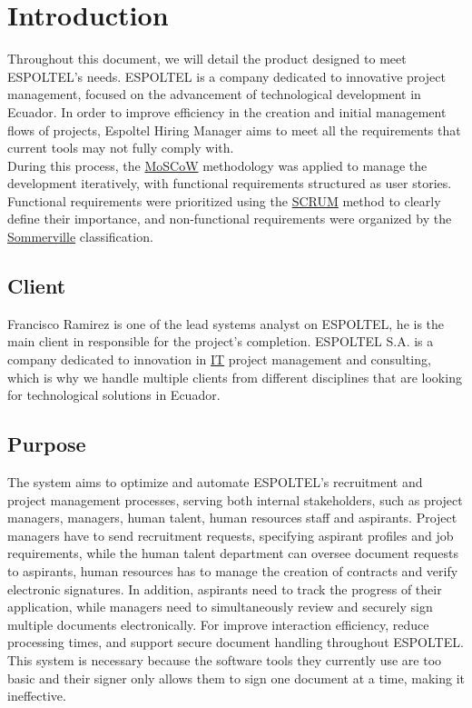 \documentclass{scrreprt}
\begin{document}
\chapter{Introduction}
Throughout this document, we will detail the product designed to meet ESPOLTEL's needs. ESPOLTEL is a company dedicated to innovative project management, focused on the advancement of technological development in Ecuador. In order to improve efficiency in the creation and initial management flows of projects, Espoltel Hiring Manager aims to meet all the requirements that current tools may not fully comply with.\\
During this process, the \hyperlink{moscow}{MoSCoW} methodology was applied to manage the development iteratively, with functional requirements structured as user stories. Functional requirements were prioritized using the \hyperlink{scrum}{SCRUM} method to clearly define their importance, and non-functional requirements were organized by the \hyperlink{sommerville}{Sommerville} classification.

\section{Client}
Francisco Ramirez is one of the lead systems analyst on ESPOLTEL, he is the main client in responsible for the project's completion. ESPOLTEL S.A. is a company dedicated to innovation in \hyperlink{it}{IT} project management and consulting, which is why we handle multiple clients from different disciplines that are looking for technological solutions in Ecuador.

 
\section{Purpose}
The system aims to optimize and automate ESPOLTEL's recruitment and project management processes, serving both internal stakeholders, such as project managers, managers, human talent, human resources staff and aspirants. Project managers have to send recruitment requests, specifying aspirant profiles and job requirements, while the human talent department can oversee document requests to aspirants, human resources has to manage the creation of contracts and verify electronic signatures. In addition, aspirants need to track the progress of their application, while managers need to simultaneously review and securely sign multiple documents electronically. For improve interaction efficiency, reduce processing times, and support secure document handling throughout ESPOLTEL. This system is necessary because the software tools they currently use are too basic and their signer only allows them to sign one document at a time, making it ineffective.
\end{document}
